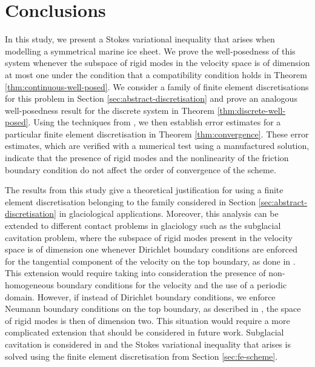 \documentclass[onefignum,onetabnum]{siamart190516}
\begin{document}
\section{Conclusions}

In this study, we present a Stokes variational inequality that arises when modelling a symmetrical marine ice sheet. We prove the well-posedness of this system whenever the subspace of rigid modes in the velocity space is of dimension at most one under the condition that a compatibility condition holds in Theorem \ref{thm:continuous-well-posed}. We consider a family of finite element discretisations for this problem in Section \ref{sec:abstract-discretisation} and prove an analogous well-posedness result for the discrete system in Theorem \ref{thm:discrete-well-posed}. Using the techniques from \cite{belenki2012, hirn2013}, we then establish error estimates for a particular finite element discretisation in Theorem \ref{thm:convergence}. These error estimates, which are verified with a numerical test using a manufactured solution, indicate that the presence of rigid modes and the nonlinearity of the friction boundary condition do not affect the order of convergence of the scheme.

The results from this study give a theoretical justification for using a finite element discretisation belonging to the family considered in Section \ref{sec:abstract-discretisation} in glaciological applications. Moreover, this analysis can be extended to different contact problems in glaciology such as the subglacial cavitation problem, where the subspace of rigid modes present in the velocity space is of dimension one whenever Dirichlet boundary conditions are enforced for the tangential component of the velocity on the top boundary, as done in \cite{gagliardini2007}. This extension would require taking into consideration the presence of non-homogeneous boundary conditions for the velocity and the use of a periodic domain. However, if instead of Dirichlet boundary conditions, we enforce Neumann boundary conditions on the top boundary, as described in \cite{dediego2022}, the space of rigid modes is then of dimension two. This situation would require a more complicated extension that should be considered in future work. Subglacial cavitation is considered in \cite{dediego2022} and the Stokes variational inequality that arises is solved using the finite element discretisation from Section \ref{sec:fe-scheme}.
\end{document}
